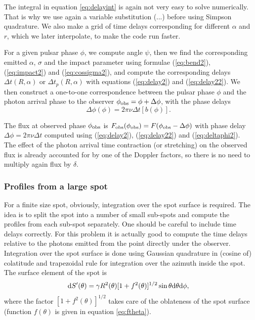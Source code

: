 \documentclass{wihuri}
\def\be{\begin{equation}}
\def\ee{\end{equation}}
\def\d{{\rm d}}
\def\phiobs{\phi_{\rm obs}}
\begin{document}
The integral in equation \ref{eq:delayint} is again not very easy to solve numerically. That is why we use again a variable substitution (...) before using Simpson quadrature. We also make a grid of time delays corresponding for different $\alpha$ and $r$, which we later interpolate, to make the code run faster.

For a given pulsar phase $\phi$, we compute angle $\psi$, then
we find the corresponding emitted $\alpha$, $\sigma$ and the impact parameter
using  formulae (\ref{eq:bend2}), (\ref{eq:impact2}) and (\ref{eq:cossigma2}), and
  compute the corresponding  delays $\Delta t(R,\alpha)$ or $\Delta t_{p}(R,\alpha)$
with equations  (\ref{eq:delay2}) and (\ref{eq:delay22}).
We then construct a one-to-one
correspondence between the pulsar phase $\phi$ and
the photon arrival phase to the observer $\phiobs=\phi+ \Delta\phi$,
with the phase delays
\be \label{eq:deltaphi2}
\Delta \phi(\phi) =2\pi\nu \Delta t[b(\phi)] .
\ee

The flux at observed phase $\phiobs$ is
${F}_{\rm obs}(\phiobs)=F(\phiobs-\Delta\phi)$ with
phase delay  $\Delta \phi=2\pi\nu\Delta t$
computed using (\ref{eq:delay2}), (\ref{eq:delay22}) and (\ref{eq:deltaphi2}).
The effect of the photon arrival time contraction (or stretching) on
the observed flux is already accounted for by one of the Doppler factors, 
so there is no need to multiply again flux by $\delta$.



\subsubsection{Profiles from a large spot} 

For a finite size spot, obviously, integration over the spot surface is required. 
The idea is to split the spot into a number of small sub-spots and compute the profiles from each sub-spot separately. One should be careful to include time delays correctly. For this problem it is actually good to compute the time delays relative to the photons emitted from the point directly under the observer. Integration over the spot surface is done using Gaussian quadrature in (cosine of) colatitude and trapezoidal rule for integration over the azimuth inside the spot. The surface element of the spot is 
\be \label{eq:surf_element}
\d S'(\theta) = \gamma R^{2}(\theta) [1+f^{2}(\theta)]^{1/2} \sin \theta \d \theta \d \phi ,
\ee
where the factor $[1+f^{2}(\theta)]^{1/2}$ takes care of the oblateness of the spot surface (function $f(\theta)$ is given in equation \ref{eq:ftheta}).
\end{document}
